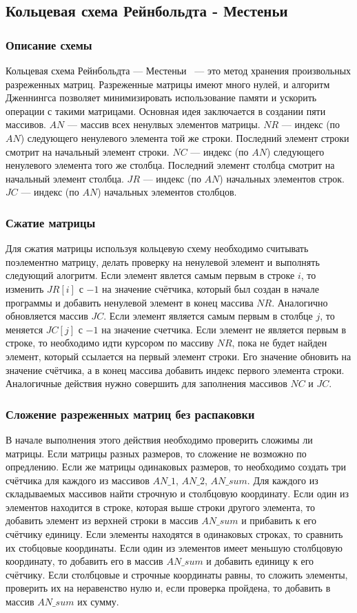 \documentclass[12pt, a4paper]{article}
\begin{document}
\subsection{Кольцевая схема Рейнбольдта - Местеньи}
\subsubsection{Описание схемы}
Кольцевая схема Рейнбольдта --- Местеньи~\cite{book} --- это метод хранения произвольных разреженных матриц. Разреженные матрицы имеют много нулей, и алгоритм Дженнингса позволяет минимизировать использование памяти и ускорить операции с такими матрицами. Основная идея заключается в создании пяти массивов. $AN$ --- массив всех ненулвых элементов матрицы. $NR$ --- индекс (по $AN$) следующего ненулевого элемента той же строки. Последний элемент строки смотрит на начальный элемент строки. $NC$ --- индекс (по $AN$) следующего ненулевого элемента того же столбца. Последний элемент столбца смотрит на начальный элемент столбца. $JR$ --- индекс (по $AN$) начальных элементов строк. $JC$ --- индекс (по $AN$) начальных элементов столбцов. 
\subsubsection{Сжатие матрицы}
Для сжатия матрицы используя кольцевую схему необходимо считывать поэлементно матрицу, делать проверку на ненулевой элемент и выполнять следующий алогритм. Если элемент явлется самым первым в строке $i$, то изменить $JR[i]$ с $-1$ на значение счётчика, который был создан в начале программы и добавить ненулевой элемент в конец массива $NR$. Аналогично обновляется массив $JC$. Если элемент является самым первым в столбце $j$, то меняется $JC[j]$ с $-1$ на значение счетчика. Если элемент не является первым в строке, то необходимо идти курсором по массиву $NR$, пока не будет найден элемент, который ссылается на первый элемент строки. Его значение обновить на значение счётчика, а в конец массива добавить индекс первого элемента строки. Аналогичные действия нужно совершить для заполнения массивов $NC$ и $JC$. 

\subsubsection{Сложение разреженных матриц без распаковки}
В начале выполнения этого действия необходимо проверить сложимы ли матрицы. Если матрицы разных размеров, то сложение не возможно по опредлению. Если же матрицы одинаковых размеров, то необходимо создать три счётчика для каждого из массивов $AN\_1$, $AN\_2$, $AN\_sum$. Для каждого из складываемых массивов найти строчную и столбцовую координату. Если один из элементов находится в строке, которая выше строки другого элемента, то добавить элемент из верхней строки в массив $AN\_sum$ и прибавить к его счётчику единицу. Если элементы находятся в одинаковых строках, то сравнить их стобцовые координаты. Если один из элементов имеет меньшую столбцовую координату, то добавить его в массив $AN\_sum$ и добавить единицу к его счётчику. Если столбцовые и строчные координаты равны, то сложить элементы, проверить их на неравенство нулю и, если проверка пройдена, то добавить в массив $AN\_sum$ их сумму.
\end{document}
